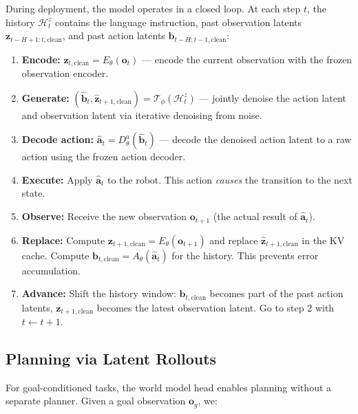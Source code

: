 \documentclass{article}
\newcommand{\vo}{\bm{o}}
\newcommand{\vz}{\bm{z}}
\newcommand{\va}{\bm{a}}
\newcommand{\vb}{\bm{b}}
\begin{document}
During deployment, the model operates in a closed loop. At each step $t$, the history $\mathcal{H}_t^z$ contains the language instruction, past observation latents $\vz_{t-H+1:t,\text{clean}}$, and past action latents $\vb_{t-H:t-1,\text{clean}}$:

\begin{enumerate}[leftmargin=*,itemsep=2pt]
  \item \textbf{Encode:} $\vz_{t,\text{clean}} = E_\theta(\vo_t)$ --- encode the current observation with the frozen observation encoder.
  \item \textbf{Generate:} $(\hat{\vb}_t, \hat{\vz}_{t+1,\text{clean}}) = \mathcal{T}_\phi(\mathcal{H}_t^z)$ --- jointly denoise the action latent and observation latent via iterative denoising from noise.
  \item \textbf{Decode action:} $\hat{\va}_t = D_\theta^a(\hat{\vb}_t)$ --- decode the denoised action latent to a raw action using the frozen action decoder.
  \item \textbf{Execute:} Apply $\hat{\va}_t$ to the robot. This action \emph{causes} the transition to the next state.
  \item \textbf{Observe:} Receive the new observation $\vo_{t+1}$ (the actual result of $\hat{\va}_t$).
  \item \textbf{Replace:} Compute $\vz_{t+1,\text{clean}} = E_\theta(\vo_{t+1})$ and replace $\hat{\vz}_{t+1,\text{clean}}$ in the KV cache. Compute $\vb_{t,\text{clean}} = A_\theta(\hat{\va}_t)$ for the history. This prevents error accumulation.
  \item \textbf{Advance:} Shift the history window: $\vb_{t,\text{clean}}$ becomes part of the past action latents, $\vz_{t+1,\text{clean}}$ becomes the latest observation latent. Go to step 2 with $t \leftarrow t+1$.
\end{enumerate}

\subsection{Planning via Latent Rollouts}
\label{sec:planning}

For goal-conditioned tasks, the world model head enables planning without a separate planner. Given a goal observation $\vo_g$, we:
\end{document}
